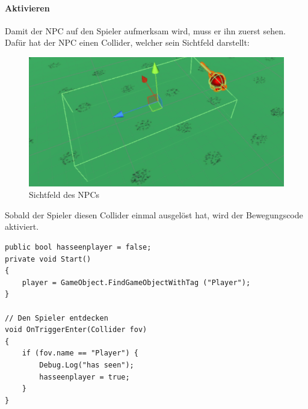 \paragraph{Aktivieren}
Damit der NPC auf den Spieler aufmerksam wird, muss er ihn zuerst sehen.
Dafür hat der NPC einen Collider, welcher sein Sichtfeld darstellt:
\begin{figure}[H]
\includegraphics[scale=1]{screenshots/fov.png}
\caption{Sichtfeld des NPCs}
\end{figure}
\noindent Sobald der Spieler diesen Collider einmal ausgelöst hat, wird der Bewegungscode aktiviert.
\begin{lstlisting}
public bool hasseenplayer = false;
private void Start()
{
	player = GameObject.FindGameObjectWithTag ("Player");
}
	
// Den Spieler entdecken
void OnTriggerEnter(Collider fov)
{	
	if (fov.name == "Player") {
		Debug.Log("has seen");
		hasseenplayer = true;
	}
}
\end{lstlisting}

